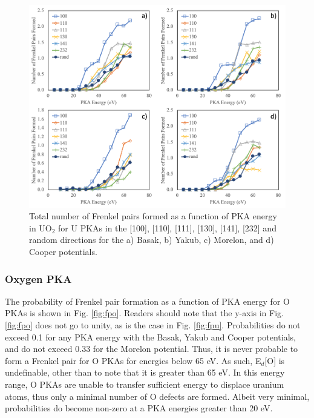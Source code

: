 \documentclass[review]{elsarticle}
\providecommand{\DIFaddtex}[1]{{\protect\color{blue} \sf #1}} %
\providecommand{\DIFaddbegin}{} %
\providecommand{\DIFaddend}{} %
\providecommand{\DIFadd}[1]{\texorpdfstring{\DIFaddtex{#1}}{#1}} %
\newcommand{\DIFaddincludegraphics}[2][]{{\color{blue}\fbox{\DIFOincludegraphics[#1]{#2}}}} %
\DeclareRobustCommand{\DIFaddbegin}{\DIFOaddbegin \let\includegraphics\DIFaddincludegraphics} %
\DeclareRobustCommand{\DIFaddend}{\DIFOaddend \let\includegraphics\DIFOincludegraphics} %
\begin{document}
\begin{figure}[h]
 \centering
 \includegraphics[width=1.0\textwidth]{FP_UN.png}
 \caption{Total number of Frenkel pairs formed as a function of PKA energy in UO$_2$ for U PKAs in the [100], [110], [111], [130], [141], [232] and random directions for the a) Basak, b) Yakub, c) Morelon, and d) Cooper potentials. }
 \label{fig:fpun}
\end{figure}

\FloatBarrier

\subsubsection{Oxygen PKA}

The probability of Frenkel pair formation as a function of PKA energy for O PKAs is shown in Fig. \ref{fig:fpo}. \DIFaddbegin \DIFadd{Readers should note that the y-axis in Fig. \ref{fig:fpo} does not go to unity, as is the case in Fig. \ref{fig:fpu}. }\DIFaddend Probabilities do not exceed 0.1 for any PKA energy with the Basak, Yakub and Cooper potentials, and do not exceed 0.33 for the Morelon potential. Thus, it is never probable to form a Frenkel pair for O PKAs for energies below 65 eV. As such, E$_d$[O] is undefinable, other than to note that it is greater than 65 eV. In this energy range, O PKAs are unable to transfer sufficient energy to displace uranium atoms, thus only a minimal number of O defects are formed. Albeit very minimal, probabilities do become non-zero at a PKA energies greater than 20 eV.
\end{document}
